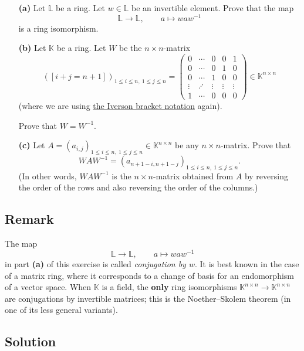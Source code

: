 \documentclass[paper=a4, fontsize=12pt]{scrartcl} %
\newcommand{\KK}{\mathbb{K}} %
\newcommand{\LL}{\mathbb{L}} %
\newcommand{\tup}[1]{\left( #1 \right)}
\newcommand{\ive}[1]{\left[ #1 \right]}
\theoremstyle{plainsl}
\theoremstyle{definition}
\theoremstyle{remark}
\begin{document}
\begin{enumerate}

\item[\textbf{(a)}]
Let $\LL$ be a ring.
Let $w \in \LL$ be an invertible element.
Prove that the map
\[
\LL \to \LL , \qquad a \mapsto waw^{-1}
\]
is a ring isomorphism.

\item[\textbf{(b)}] Let $\KK$ be a ring.
Let $W$ be the $n \times n$-matrix
\[
\tup{ \ive{ i + j = n + 1 } } _{1\leq i\leq n,\ 1\leq j\leq n}
=
\begin{pmatrix}
0 & \cdots & 0 & 0 & 1\\
0 & \cdots & 0 & 1 & 0\\
0 & \cdots & 1 & 0 & 0\\
\vdots & \iddots & \vdots & \vdots & \vdots\\
1 & \cdots & 0 & 0 & 0
\end{pmatrix}
\in \KK^{n \times n}
\]
(where we are using
\href{https://en.wikipedia.org/wiki/Iverson_bracket}{the
Iverson bracket notation} again).

Prove that $W = W^{-1}$.

\item[\textbf{(c)}] Let
$A = \tup{ a_{i,j} }_{1\leq i\leq n,\ 1\leq j\leq n}
\in \KK^{n \times n}$ be any $n \times n$-matrix.
Prove that
\[
WAW^{-1}
= \tup{ a_{n+1-i,n+1-j} }_{1\leq i\leq n,\ 1\leq j\leq n}.
\]
(In other words, $WAW^{-1}$ is the $n \times n$-matrix obtained from $A$ by
reversing the order of the rows and also reversing the order of the columns.)

\end{enumerate}

\subsection{Remark}

The map
\[
\LL \to \LL , \qquad a \mapsto waw^{-1}
\]
in part \textbf{(a)} of this exercise is called \textit{conjugation by $w$}.
It is best known in the case of a matrix ring, where it corresponds to a
change of basis for an endomorphism of a vector space. When $\KK$ is a
field, the \textbf{only} ring isomorphisms $\KK^{n \times n}
\to \KK^{n \times n}$ are conjugations by invertible matrices;
this is the Noether--Skolem theorem (in one of its less general variants).

\subsection{Solution}
\end{document}
